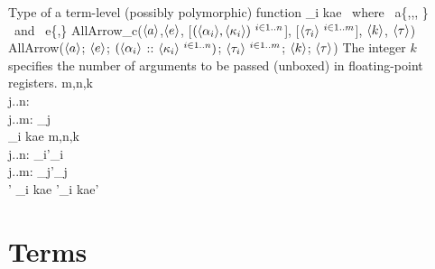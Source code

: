 \documentclass[12pt,twoside,fleqn]{article}
\begin{document}
  {Type of a term-level (possibly polymorphic) function}
  {
          {\ctype_i}
          {k}{a}{e}{\ctype} \mbox{\ where\ }
       a\in\{,,,%
             \} \mbox{\ and\ }
       e\in\{,\}}
  {AllArrow\_c($\langle{a}\rangle$,$\langle{e}\rangle$,%
               [$(\langle{\alpha_i}\rangle,\langle{\kappa_i}\rangle)\ {}^{i\in 1..n}$],%
               [$\langle{\tau_i}\rangle\ {}^{i\in 1..m}$], $\langle{k}\rangle$,%
               $\langle{\tau}\rangle$)}
  {AllArrow($\langle{a}\rangle$; $\langle{e}\rangle$;
               $(\langle{\alpha_i}\rangle$ :: $\langle{\kappa_i}\rangle\ {}^{i\in 1..n})$;
               $\langle{\tau_i}\rangle\ {}^{i\in 1..m}$; 
               $\langle{k}\rangle$;
               $\langle{\tau}\rangle$)}
  {The integer $k$ specifies the number of arguments to be passed (unboxed)
   in floating-point registers. }
  {\irule
    {m,n,k\\
     \forall j..n:\quad
       \\
     \forall j..m:\quad
          {\ctype_j}{\ktype}\\
          {\ctype}{\ktype}}
    {\validtype{\context}
       {
          {\ctype_i}
          {k}{a}{e}{\ctype}}}
   \irule
    {m,n,k\\
     \forall j..n:\quad
          {\kind_i}{\kind'_i}\\
     \forall j..m:\quad
          {\ctype_j}{\ctype'_j}{\ktype}\\
          {\ctype}{\ctype'}{\ktype}}
    {\equivtype{\context}
       {
          {\constructor_i}
          {k}{a}{e}{\constructor}}
       {
          {\constructor'_i}
          {k}{a}{e}{\constructor'}}}
  }


\section{Terms}
\end{document}
